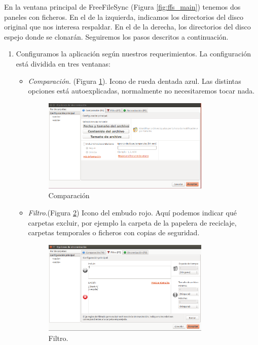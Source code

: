 \documentclass[a4paper,12pt]{article}
\begin{document}
En la ventana principal de FreeFileSync (Figura \ref{fig:ffs_main}) tenemos dos paneles con ficheros. En el de la izquierda, indicamos los directorios
del disco original que nos interesa respaldar.
En el de la derecha, los directorios del disco espejo donde se clonarán.
Seguiremos los pasos descritos a continuación.


    \begin{enumerate}
    \item
Configuramos la aplicación según nuestros requerimientos.
La configuración está dividida en tres ventanas:

\begin{itemize}
\item
\emph{Comparación}. (Figura \ref{fig:ffs_compara}). Icono de rueda dentada azul.
Las distintas opciones está autoexplicadas, normalmente no necesitaremos tocar nada.
\begin{figure}[htpb]
  \centering
    \includegraphics[width=0.8\textwidth]{images/ffs02}
  \caption{Comparación}
  \label{fig:ffs_compara}
\end{figure}

\item
\emph{Filtro}.(Figura \ref{fig:ffs_filtro}) Icono del embudo rojo. Aquí podemos indicar qué carpetas excluir, por ejemplo la carpeta
de la papelera de reciclaje, carpetas temporales o ficheros con copias de seguridad.

\begin{figure}[htpb]
  \centering
    \includegraphics[width=0.8\textwidth]{images/ffs03}
  \caption{Filtro.}
  \label{fig:ffs_filtro}
\end{figure}


\end{itemize}
\end{enumerate}
\end{document}
